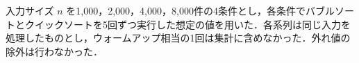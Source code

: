 入力サイズ $n$ を1,000，2,000，4,000，8,000件の4条件とし，各条件でバブルソートとクイックソートを5回ずつ実行した想定の値を用いた．各系列は同じ入力を処理したものとし，ウォームアップ相当の1回は集計に含めなかった．外れ値の除外は行わなかった．
